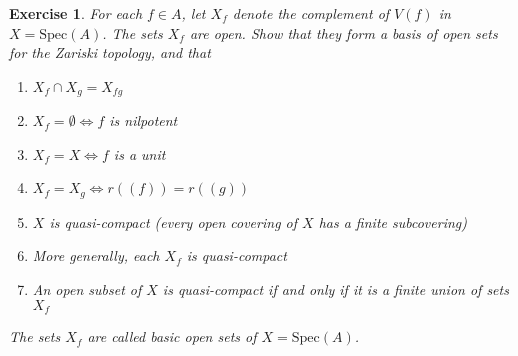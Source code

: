 \documentclass[12pt]{article}
\newtheorem{ex}{Exercise}[section]
\theoremstyle{definition}
\begin{document}
\begin{ex}
	For each $f \in A$, let $X_f$ denote the complement of $V(f)$ in $X = \text{Spec}(A)$. The sets $X_f$ are open. Show that they form a basis of open sets for the Zariski topology, and that
	\begin{enumerate}[label=(\roman*)]
		\item $X_f \cap X_g = X_{fg}$
		\item $X_f = \emptyset \iff f$ is nilpotent
		\item $X_f = X \iff f$ is a unit
		\item $X_f = X_g \iff r((f)) = r((g))$
		\item $X$ is quasi-compact (every open covering of $X$ has a finite subcovering)
		\item More generally, each $X_f$ is quasi-compact
		\item An open subset of $X$ is quasi-compact if and only if it is a finite union of sets $X_f$
	\end{enumerate}
	The sets $X_f$ are called \textit{basic open sets} of $X = \text{Spec}(A)$.
\end{ex}
\end{document}
